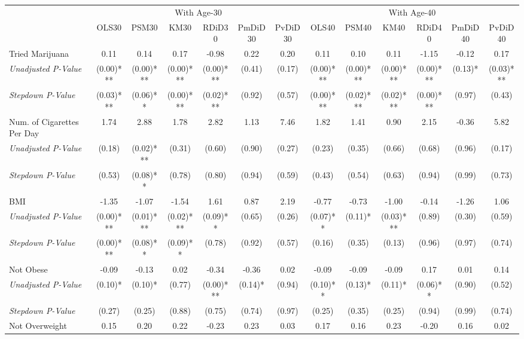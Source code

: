 \begin{tabular}{l c c c c c c c c c c c c}
\toprule
& \multicolumn{6}{c}{With Age-30} & \multicolumn{6}{c}{With Age-40} \\\cmidrule(lr){2-7} \cmidrule(lr){8-13}
 & OLS30 & PSM30 & KM30 & RDiD30 & PmDiD30 & PvDiD30 & OLS40 & PSM40 & KM40 & RDiD40 & PmDiD40 & PvDiD40 \\
\midrule
Tried Marijuana & 0.11 & 0.14 & 0.17 & -0.98 & 0.22 & 0.20 & 0.11 & 0.10 & 0.11 & -1.15 & -0.12 & 0.17 \\
\quad \textit{Unadjusted P-Value} & (0.00)*** & (0.00)*** & (0.00)*** & (0.00)*** & (0.41) & (0.17) & (0.00)*** & (0.00)*** & (0.00)*** & (0.00)*** & (0.13)* & (0.03)*** \\
\quad \textit{Stepdown P-Value} & (0.03)*** & (0.06)** & (0.00)*** & (0.02)*** & (0.92) & (0.57) & (0.00)*** & (0.02)*** & (0.02)*** & (0.00)*** & (0.97) & (0.43) \\
Num. of Cigarettes Per Day & 1.74 & 2.88 & 1.78 & 2.82 & 1.13 & 7.46 & 1.82 & 1.41 & 0.90 & 2.15 & -0.36 & 5.82 \\
\quad \textit{Unadjusted P-Value} & (0.18) & (0.02)*** & (0.31) & (0.60) & (0.90) & (0.27) & (0.23) & (0.35) & (0.66) & (0.68) & (0.96) & (0.17) \\
\quad \textit{Stepdown P-Value} & (0.53) & (0.08)** & (0.78) & (0.80) & (0.94) & (0.59) & (0.43) & (0.54) & (0.63) & (0.94) & (0.99) & (0.73) \\
BMI & -1.35 & -1.07 & -1.54 & 1.61 & 0.87 & 2.19 & -0.77 & -0.73 & -1.00 & -0.14 & -1.26 & 1.06 \\
\quad \textit{Unadjusted P-Value} & (0.00)*** & (0.01)*** & (0.02)*** & (0.09)** & (0.65) & (0.26) & (0.07)** & (0.11)* & (0.03)*** & (0.89) & (0.30) & (0.59) \\
\quad \textit{Stepdown P-Value} & (0.00)*** & (0.08)** & (0.09)** & (0.78) & (0.92) & (0.57) & (0.16) & (0.35) & (0.13) & (0.96) & (0.97) & (0.74) \\
Not Obese & -0.09 & -0.13 & 0.02 & -0.34 & -0.36 & 0.02 & -0.09 & -0.09 & -0.09 & 0.17 & 0.01 & 0.14 \\
\quad \textit{Unadjusted P-Value} & (0.10)* & (0.10)* & (0.77) & (0.00)*** & (0.14)* & (0.94) & (0.10)** & (0.13)* & (0.11)* & (0.06)** & (0.90) & (0.52) \\
\quad \textit{Stepdown P-Value} & (0.27) & (0.25) & (0.88) & (0.75) & (0.74) & (0.97) & (0.25) & (0.35) & (0.25) & (0.94) & (0.99) & (0.74) \\
Not Overweight & 0.15 & 0.20 & 0.22 & -0.23 & 0.23 & 0.03 & 0.17 & 0.16 & 0.23 & -0.20 & 0.16 & 0.02 \\

\end{tabular}
